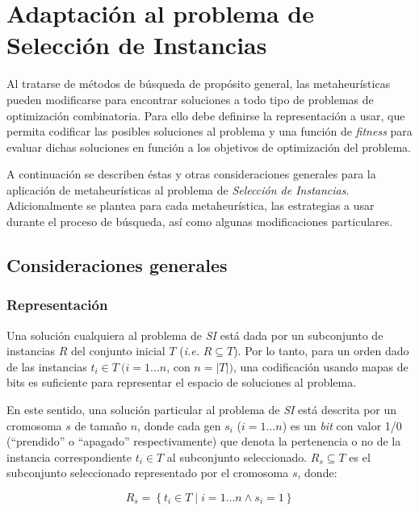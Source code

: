 \chapter{Adaptación al problema de Selección de Instancias}
\label{capitulo3}

Al tratarse de métodos de búsqueda de propósito general, las metaheurísticas pueden modificarse para encontrar soluciones a todo tipo de problemas de optimización combinatoria. Para ello debe definirse la representación a usar, que permita codificar las posibles soluciones al problema y una función de \emph{fitness} para evaluar dichas soluciones en función a los objetivos de optimización del problema.

A continuación se describen éstas y otras consideraciones generales para la aplicación de metaheurísticas al problema de \emph{Selección de Instancias}. Adicionalmente se plantea para cada metaheurística, las estrategias a usar durante el proceso de búsqueda, así como algunas modificaciones particulares.

\section{Consideraciones generales}

\subsection{Representación}

Una solución cualquiera al problema de \emph{SI} está dada por un subconjunto de instancias $R$ del conjunto inicial $T$ (\emph{i.e.} $R \subseteq T$). Por lo tanto, para un orden dado de las instancias $t_i \in T\ (i = 1 \dots n$, con $n = \vert T \vert)$, una codificación usando mapas de bits es suficiente para representar el espacio de soluciones al problema.

En este sentido, una solución particular al problema de \emph{SI} está descrita por un cromosoma $s$ de tamaño $n$, donde cada gen $s_i$ ($i = 1 \dots n$) es un \emph{bit} con valor 1/0 (``prendido'' o ``apagado'' respectivamente) que denota la pertenencia o no de la instancia correspondiente $t_i \in T$ al subconjunto seleccionado. $R_s \subseteq T$ es el subconjunto seleccionado representado por el cromosoma $s$, donde:

\begin{equation}
R_s = \left\lbrace t_i \in T \mid i = 1 \dots n \land s_i = 1 \right\rbrace
\end{equation}

